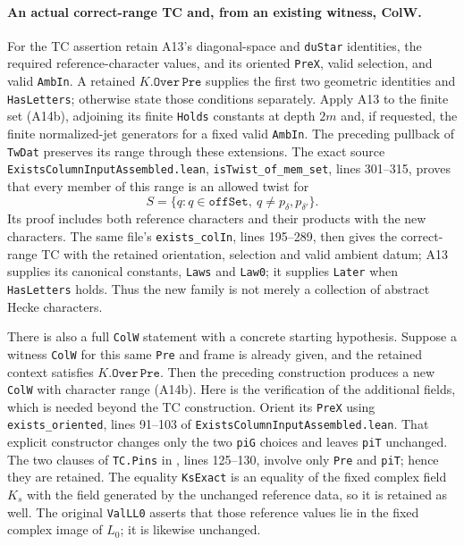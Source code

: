 \documentclass[11pt]{article}
\theoremstyle{definition}\newtheorem{definition}[theorem]{Definition}\newtheorem{remark}[theorem]{Remark}
\begin{document}
\paragraph{An actual correct-range TC and, from an existing witness, ColW.}
For the TC assertion retain A13's diagonal-space and
\texttt{duStar} identities, the required reference-character values,
and its oriented \texttt{PreX}, valid selection, and valid
\texttt{AmbIn}.  A retained $K.\texttt{Over}\,\texttt{Pre}$
supplies the first two geometric identities and
\texttt{HasLetters}; otherwise state those conditions separately.
Apply A13 to the finite set (A14b), adjoining its finite
\texttt{Holds} constants at depth $2m$ and, if requested, the finite
normalized-jet generators for a fixed valid \texttt{AmbIn}.
The preceding pullback of \texttt{TwDat} preserves its range through
these extensions.  The exact source
\nolinkurl{ExistsColumnInputAssembled.lean},
\texttt{isTwist\_of\_mem\_set}, lines 301--315, proves that every
member of this range is an allowed twist for
\[
 S=\{q:q\in\texttt{offSet},\ q\ne p_\delta,p_{\delta'}\}.
\]
Its proof includes both reference characters and their products with
the new characters.  The same file's
\texttt{exists\_colIn}, lines 195--289, then gives the correct-range
TC with the retained orientation, selection and valid ambient datum;
A13 supplies its canonical constants, \texttt{Laws} and
\texttt{Law0}; it supplies \texttt{Later} when
\texttt{HasLetters} holds.  Thus the new family is not merely
a collection of abstract Hecke characters.

There is also a full \texttt{ColW} statement with a concrete starting
hypothesis.  Suppose a witness \texttt{ColW} for this same
\texttt{Pre} and frame is already given, and the retained context
satisfies $K.\texttt{Over}\,\texttt{Pre}$.  Then the preceding construction
produces a new \texttt{ColW} with character range (A14b).
Here is the verification of the additional fields, which is needed
beyond the TC construction.  Orient its \texttt{PreX} using
\texttt{exists\_oriented}, lines 91--103 of
\nolinkurl{ExistsColumnInputAssembled.lean}.  That explicit constructor
changes only the two \texttt{piG} choices and leaves
\texttt{piT} unchanged.  The two clauses of \texttt{TC.Pins}
in ,
lines 125--130, involve only \texttt{Pre} and \texttt{piT}; hence they
are retained.  The equality \texttt{KsExact} is an equality of the
fixed complex field $K_s$ with the field generated by the unchanged
reference data, so it is retained as well.  The original
\texttt{ValLL0} asserts that those reference values lie in the fixed
complex image of $L_0$; it is likewise unchanged.
\end{document}
